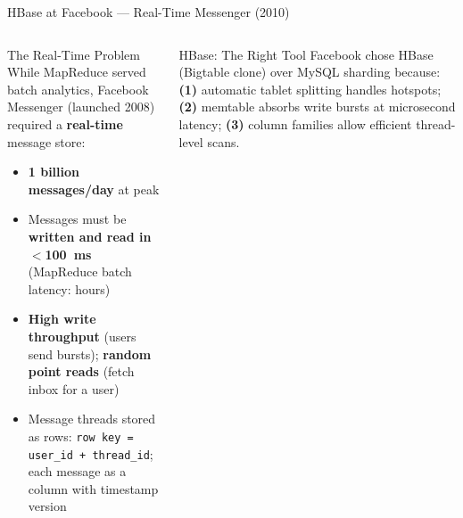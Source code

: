 \documentclass[aspectratio=169,10pt]{beamer}
\begin{document}
\begin{frame}{HBase at Facebook — Real-Time Messenger (2010)}
  \begin{columns}[T]
      \begin{block}{The Real-Time Problem}
        While MapReduce served batch analytics, Facebook Messenger
        (launched 2008) required a \textbf{real-time} message store:
        \begin{itemize}
          \item \textbf{1 billion messages/day} at peak
          \item Messages must be \textbf{written and read in $<$100~ms}
                (MapReduce batch latency: hours)
          \item \textbf{High write throughput} (users send bursts);
                \textbf{random point reads} (fetch inbox for a user)
          \item Message threads stored as rows:
                \texttt{row key = user\_id + thread\_id};
                each message as a column with timestamp version
        \end{itemize}
      \end{block}
      \vspace{4pt}
      \begin{alertblock}{HBase: The Right Tool}
        Facebook chose HBase (Bigtable clone) over MySQL sharding
        because:
        \textbf{(1)} automatic tablet splitting handles hotspots;
        \textbf{(2)} memtable absorbs write bursts at microsecond latency;
        \textbf{(3)} column families allow efficient thread-level scans.
      \end{alertblock}


\end{columns}
\end{frame}
\end{document}
